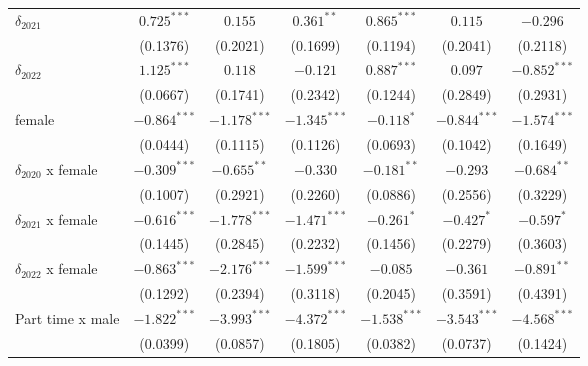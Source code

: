 \begin{tabular}{l|ccc|ccc}
$\delta_{2021}$                        &   $0.725^{***}$ &         $0.155$ &    $0.361^{**}$ &            $0.865^{***}$ &         $0.115$ &        $-0.296$ \\
                                       &        (0.1376) &        (0.2021) &        (0.1699) &                 (0.1194) &        (0.2041) &        (0.2118) \\
$\delta_{2022}$                        &   $1.125^{***}$ &         $0.118$ &        $-0.121$ &            $0.887^{***}$ &         $0.097$ &  $-0.852^{***}$ \\
                                       &        (0.0667) &        (0.1741) &        (0.2342) &                 (0.1244) &        (0.2849) &        (0.2931) \\
female                                 &  $-0.864^{***}$ &  $-1.178^{***}$ &  $-1.345^{***}$ &               $-0.118^*$ &  $-0.844^{***}$ &  $-1.574^{***}$ \\
                                       &        (0.0444) &        (0.1115) &        (0.1126) &                 (0.0693) &        (0.1042) &        (0.1649) \\
$\delta_{2020}$ x female               &  $-0.309^{***}$ &   $-0.655^{**}$ &        $-0.330$ &            $-0.181^{**}$ &        $-0.293$ &   $-0.684^{**}$ \\
                                       &        (0.1007) &        (0.2921) &        (0.2260) &                 (0.0886) &        (0.2556) &        (0.3229) \\
$\delta_{2021}$ x female               &  $-0.616^{***}$ &  $-1.778^{***}$ &  $-1.471^{***}$ &               $-0.261^*$ &      $-0.427^*$ &      $-0.597^*$ \\
                                       &        (0.1445) &        (0.2845) &        (0.2232) &                 (0.1456) &        (0.2279) &        (0.3603) \\
$\delta_{2022}$ x female               &  $-0.863^{***}$ &  $-2.176^{***}$ &  $-1.599^{***}$ &                 $-0.085$ &        $-0.361$ &   $-0.891^{**}$ \\
                                       &        (0.1292) &        (0.2394) &        (0.3118) &                 (0.2045) &        (0.3591) &        (0.4391) \\
Part time x male                       &  $-1.822^{***}$ &  $-3.993^{***}$ &  $-4.372^{***}$ &           $-1.538^{***}$ &  $-3.543^{***}$ &  $-4.568^{***}$ \\
                                       &        (0.0399) &        (0.0857) &        (0.1805) &                 (0.0382) &        (0.0737) &        (0.1424) \\

\end{tabular}
